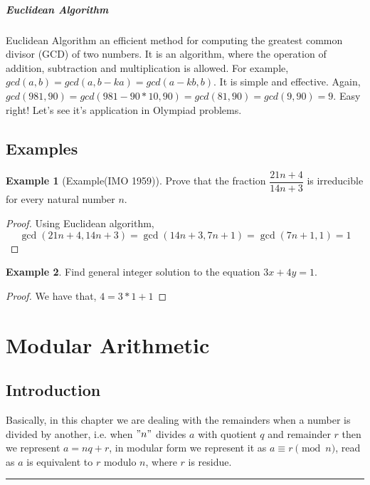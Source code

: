 \documentclass[a4paper,oneside,12 pt]{book}
\theoremstyle{definition}
\newtheorem{exmp}{Example}[section]
\theoremstyle{definition}
\theoremstyle{definition}
\begin{document}
\paragraph{Euclidean Algorithm}
Euclidean Algorithm an efficient method for computing the greatest common divisor (GCD) of two numbers. It is an algorithm, where the operation of addition, subtraction and multiplication is allowed. For example, $gcd(a,b)=gcd(a,b-ka)=gcd(a-kb,b)$. It is simple and effective. Again, $gcd(981,90)=gcd(981-90*10,90)=gcd(81,90)=gcd(9,90)=9$.
Easy right! Let's see it's application in Olympiad problems.


\section{Examples}
\begin{exmp} [Example(IMO 1959)]
Prove that the fraction $ \dfrac{21n + 4}{14n + 3}$ is irreducible for every natural number $ n$.
\begin{proof}
Using Euclidean algorithm,
$$\gcd(21n+4,14n+3)=\gcd(14n+3, 7n+1)=\gcd(7n+1,1)=1$$

\end{proof}
\end{exmp}

\begin{exmp}
Find general integer solution to the equation $3x+4y=1$.
\begin{proof}
We have that, $4=3*1+1 $
\end{proof}
\end{exmp}

\chapter{Modular Arithmetic}
\section{Introduction}
Basically, in this chapter we are dealing with the remainders when a number is divided by another, i.e. when $"n"$ divides $a$ with quotient $q$ and remainder $r$ then we represent $a=nq+r$, in modular form we represent it as $a \equiv r \pmod{n}$, read as $a$ is equivalent to $r$ modulo $n$, where $r$ is residue.
\rule{\textwidth}{1pt}
\end{document}
